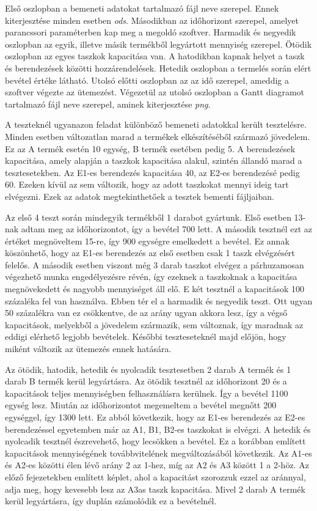 Első oszlopban a bemeneti adatokat tartalmazó fájl neve szerepel. Ennek kiterjesztése minden esetben \textit{ods}. Másodikban az időhorizont szerepel, amelyet parancssori paraméterben kap meg a megoldó szoftver. Harmadik és negyedik oszlopban az egyik, illetve másik termékből legyártott mennyiség szerepel. Ötödik oszlopban az egyes taszkok kapacitása van. A hatodikban kapnak helyet a taszk és berendezések közötti hozzárendelések. Hetedik oszlopban a termelés során elért bevétel értéke látható. Utolsó előtti oszlopban az az idő szerepel, ameddig a szoftver végezte az ütemezést. Végezetül az utolsó oszlopban a Gantt diagramot tartalmazó fájl neve szerepel, aminek kiterjesztése \textit{png}.

A teszteknél ugyanazon feladat különböző bemeneti adatokkal került tesztelésre. Minden esetben változatlan marad a termékek elkészítéséből származó jövedelem. Ez az A termék esetén 10 egység, B termék esetében pedig 5. A berendezések kapacitása, amely alapján a taszkok kapacitása alakul, szintén állandó marad a tesztesetekben. Az E1-es berendezés kapacitása 40, az E2-es berendezésé pedig 60. Ezeken kívül az sem változik, hogy az adott taszkokat mennyi ideig tart elvégezni. Ezek az adatok megtekinthetőek a tesztek bementi fájljaiban.

Az első 4 teszt során mindegyik termékből 1 darabot gyártunk. Első esetben 13-nak adtam meg az időhorizontot, így a bevétel 700 lett. A második tesztnél ezt az értéket megnöveltem 15-re, így 900 egységre emelkedett a bevétel. Ez annak köszönhető, hogy az E1-es berendezés az első esetben csak 1 taszk elvégzésért felelős. A második esetben viszont még 3 darab taszkot elvégez a párhuzamosan végezhető munka engedélyezésre révén, így ezeknek a  taszkoknak a kapacitása megnövekedett és nagyobb mennyiséget áll elő. E két tesztnél a kapacitások 100 százaléka fel van használva. Ebben tér el a harmadik és negyedik teszt. Ott ugyan 50 százalékra van ez csökkentve, de az arány ugyan akkora lesz, így a végső kapacitások, melyekből a jövedelem származik, sem változnak, így maradnak az eddigi elérhető legjobb bevételek. Későbbi teszteseteknél majd előjön, hogy miként változik az ütemezés ennek hatására.

Az ötödik, hatodik, hetedik és nyolcadik tesztesetben 2 darab A termék és 1 darab B termék kerül legyártásra. Az ötödik tesztnél az időhorizont 20 és a kapacitások teljes mennyiségben felhasználásra kerülnek. Így a bevétel 1100 egység lesz. Miután az időhorizontot megemeltem a bevétel megnőtt 200 egységgel, így 1300 lett. Ez abból következik, hogy az E1-es berendezés az E2-es berendezéssel egyetemben már az A1, B1, B2-es taszkokat is elvégzi. A hetedik és nyolcadik tesztnél észrevehető, hogy lecsökken a bevétel. Ez a korábban említett kapacitások mennyiségének továbbvitelének megváltozásából következik. Az A1-es és A2-es közötti élen lévő arány 2 az 1-hez, míg az A2 és A3 között 1 a 2-höz. Az előző fejezetekben említett képlet, ahol a kapacitást szorozzuk ezzel az aránnyal, adja meg, hogy kevesebb lesz az A3as taszk kapacitása. Mivel 2 darab A termék kerül legyártásra, így duplán számolódik ez a bevételnél. 

